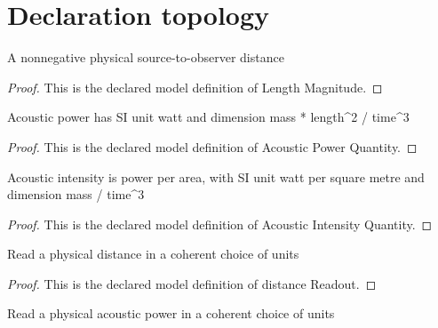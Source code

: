 \section{Declaration topology}
\begin{definition}
  \label{def:physics:phyx-mini-0212:phyxminiproblems-problemphyxmini0212-lengthmagnitude}
  A nonnegative physical source-to-observer distance
\end{definition}
\begin{proof}
  This is the declared model definition of Length Magnitude.
\end{proof}
\begin{definition}
  \label{def:physics:phyx-mini-0212:phyxminiproblems-problemphyxmini0212-acousticpowerquantity}
  Acoustic power has SI unit watt and dimension mass * length\textasciicircum{}2 / time\textasciicircum{}3
\end{definition}
\begin{proof}
  This is the declared model definition of Acoustic Power Quantity.
\end{proof}
\begin{definition}
  \label{def:physics:phyx-mini-0212:phyxminiproblems-problemphyxmini0212-acousticintensityquantity}
  Acoustic intensity is power per area, with SI unit watt per square metre and dimension mass / time\textasciicircum{}3
\end{definition}
\begin{proof}
  This is the declared model definition of Acoustic Intensity Quantity.
\end{proof}
\begin{definition}
  \label{def:physics:phyx-mini-0212:phyxminiproblems-problemphyxmini0212-distancereadout}
  Read a physical distance in a coherent choice of units
\end{definition}
\begin{proof}
  This is the declared model definition of distance Readout.
\end{proof}
\begin{definition}
  \label{def:physics:phyx-mini-0212:phyxminiproblems-problemphyxmini0212-acousticpowerreadout}
  Read a physical acoustic power in a coherent choice of units
\end{definition}
